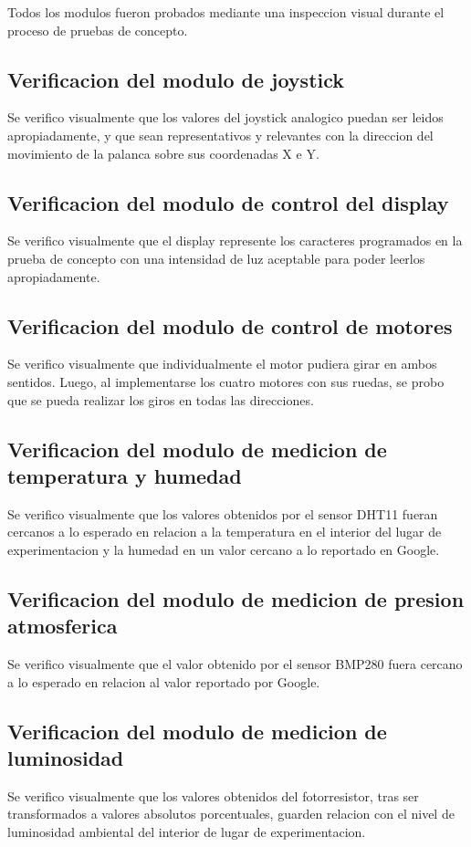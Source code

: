Todos los modulos fueron probados mediante una inspeccion visual durante el proceso de pruebas de concepto. 


\subsection{Verificacion del modulo de joystick}
Se verifico visualmente que los valores del joystick analogico puedan ser leidos apropiadamente, y que sean representativos y relevantes con la direccion del movimiento de la palanca sobre sus coordenadas X e Y.

\subsection{Verificacion del modulo de control del display}
Se verifico visualmente que el display represente los caracteres programados en la prueba de concepto con una intensidad de luz aceptable para poder leerlos apropiadamente.


\subsection{Verificacion del modulo de control de motores}
Se verifico visualmente que individualmente el motor pudiera girar en ambos sentidos. Luego, al implementarse los cuatro motores con sus ruedas, se probo que se pueda realizar los giros en todas las direcciones.

\subsection{Verificacion del modulo de medicion de temperatura y humedad}
Se verifico visualmente que los valores obtenidos por el sensor DHT11 fueran cercanos a lo esperado en relacion a la temperatura en el interior del lugar de experimentacion y la humedad en un valor cercano a lo reportado en Google.

\subsection{Verificacion del modulo de medicion de presion atmosferica}
Se verifico visualmente que el valor obtenido por el sensor BMP280 fuera cercano a lo esperado en relacion al valor reportado por Google.


\subsection{Verificacion del modulo de medicion de luminosidad}
Se verifico visualmente que los valores obtenidos del fotorresistor, tras ser transformados a valores absolutos porcentuales, guarden relacion con el nivel de luminosidad ambiental del interior de lugar de experimentacion.


